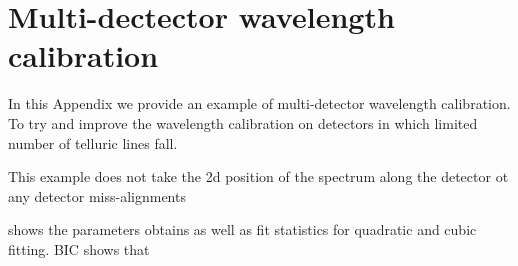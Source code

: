 
\chapter{Multi-dectector wavelength calibration} %
\label{appendix:wavelength_fitting}

In this Appendix we provide an example of multi-detector wavelength calibration. To try and improve the wavelength calibration on detectors in which limited number of telluric lines fall.







This example does not take the 2d position of the spectrum along the detector ot any detector miss-alignments

 shows the parameters obtains as well as fit statistics for quadratic and cubic fitting. BIC shows that 

